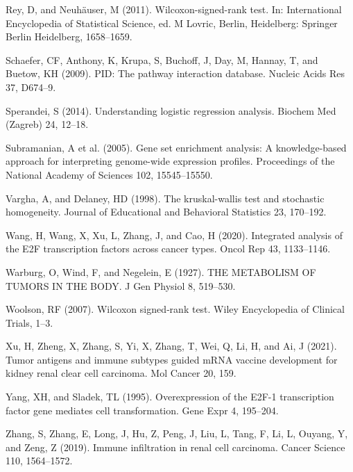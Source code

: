 \documentclass[
  parskip,
  oneside]{\documentclass[oneside]{book}}
\newlength{\cslhangindent}
\newlength{\cslentryspacingunit} %
\newenvironment{CSLReferences}[2] %
 {%
  \setlength{\parindent}{0pt}
  \ifodd #1
  \let\oldpar\par
  \def\par{\hangindent=\cslhangindent\oldpar}
  \fi
  \setlength{\parskip}{#2\cslentryspacingunit}
 }%
 {}
\begin{document}
\begin{CSLReferences}{0}{0}
\leavevmode{}%
Rey, D, and Neuhäuser, M (2011). Wilcoxon-signed-rank test. In:
International Encyclopedia of Statistical Science, ed. M Lovric, Berlin,
Heidelberg: Springer Berlin Heidelberg, 1658--1659.

\leavevmode{}%
Schaefer, CF, Anthony, K, Krupa, S, Buchoff, J, Day, M, Hannay, T, and
Buetow, KH (2009). PID: The pathway interaction database. Nucleic Acids
Res 37, D674--9.

\leavevmode{}%
Sperandei, S (2014). Understanding logistic regression analysis. Biochem
Med (Zagreb) 24, 12--18.

\leavevmode{}%
Subramanian, A et al. (2005). Gene set enrichment analysis: A
knowledge-based approach for interpreting genome-wide expression
profiles. Proceedings of the National Academy of Sciences 102,
15545--15550.

\leavevmode{}%
Vargha, A, and Delaney, HD (1998). The kruskal-wallis test and
stochastic homogeneity. Journal of Educational and Behavioral Statistics
23, 170--192.

\leavevmode{}%
Wang, H, Wang, X, Xu, L, Zhang, J, and Cao, H (2020). Integrated
analysis of the E2F transcription factors across cancer types. Oncol Rep
43, 1133--1146.

\leavevmode{}%
Warburg, O, Wind, F, and Negelein, E (1927). THE METABOLISM OF TUMORS IN
THE BODY. J Gen Physiol 8, 519--530.

\leavevmode{}%
Woolson, RF (2007). Wilcoxon signed‐rank test. Wiley Encyclopedia of
Clinical Trials, 1--3.

\leavevmode{}%
Xu, H, Zheng, X, Zhang, S, Yi, X, Zhang, T, Wei, Q, Li, H, and Ai, J
(2021). Tumor antigens and immune subtypes guided mRNA vaccine
development for kidney renal clear cell carcinoma. Mol Cancer 20, 159.

\leavevmode{}%
Yang, XH, and Sladek, TL (1995). Overexpression of the E2F-1
transcription factor gene mediates cell transformation. Gene Expr 4,
195--204.

\leavevmode{}%
Zhang, S, Zhang, E, Long, J, Hu, Z, Peng, J, Liu, L, Tang, F, Li, L,
Ouyang, Y, and Zeng, Z (2019). Immune infiltration in renal cell
carcinoma. Cancer Science 110, 1564--1572.


\end{CSLReferences}
\end{document}
